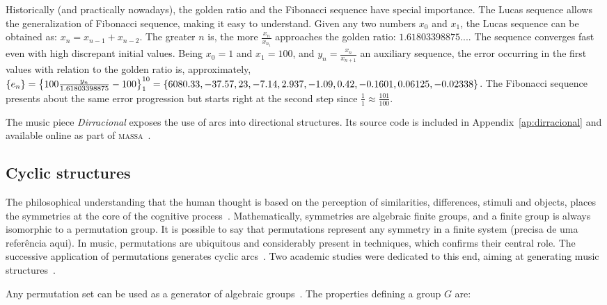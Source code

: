 \documentclass[
 aip,
 jmp,
 amsmath,amssymb,
 reprint,
]{revtex4-1}
\newcommand{\massa}{{\large \textsc{massa}}}
\begin{document}
Historically (and practically nowadays), the golden ratio and the Fibonacci sequence have special importance. The Lucas sequence allows the generalization of
Fibonacci sequence, making it easy to understand. Given any two numbers $x_0$
and $x_1$, the Lucas sequence can be obtained as: $x_n=x_{n-1}+x_{n-2}$. The greater $n$ is, the more $\frac{x_{n}}{x_{n_1}}$ approaches the golden ratio:
$1.61803398875...$. The sequence converges fast even with high discrepant
initial values. Being $x_0=1$ and $x_1=100$, and $y_n=\frac{x_n}{x_{n+1}}$ an
auxiliary sequence, the error occurring in the first values with
relation to the golden ratio is, approximately, $\{ e_n \}
=\left\{100\frac{y_n}{1.61803398875}-100 \right\}_1^{10}=\{6080.33, -37.57, 23,
-7.14, 2.937, -1.09, 0.42, -0.1601, \\ 0.06125, -0.02338\}$. The Fibonacci sequence
presents about the same error progression but starts right at the second step since $\frac{1}{1}\approx\frac{101}{100}$.

The music piece \emph{Dirracional} exposes the use of arcs into directional structures.
Its source code is included in Appendix~\ref{ap:dirracional} and available online as part
of \massa~\cite{MASSA}.

\subsection{Cyclic structures}\label{estCic}

The philosophical understanding that the human thought is based on the perception of
similarities, differences, stimuli and objects, places the symmetries
at the core of the cognitive process~\cite{Deleuze}. Mathematically, symmetries
are algebraic finite groups, and a finite group is always isomorphic to a permutation
group. It is possible to say that permutations represent any symmetry in a
finite system (precisa de uma referência aqui). In music, permutations are ubiquitous and considerably present in techniques, which confirms their central role. The successive application of permutations generates cyclic arcs~\cite{change,Zamacois,permMusic}. Two academic studies were dedicated to this end, aiming at generating music structures~\cite{figgusOriginal, figgusEspacializacao}.

Any permutation set can be used as a generator of algebraic groups~\cite{permMusic}.
The properties defining a group $G$ are:
\end{document}
